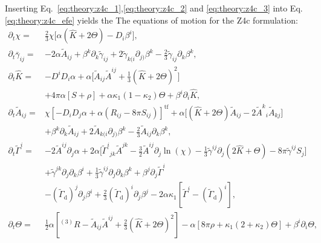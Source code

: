 Inserting Eq.~\eqref{eq:theory:z4c_1},\eqref{eq:theory:z4c_2} and \eqref{eq:theory:z4c_3} into
Eq.\eqref{eq:theory:z4c_efe} yields the 
The equations of motion for the Z4c formulation:
%
\begin{equation}
    \begin{aligned}
    \partial_t\chi =& \frac{2}{3}\chi \Big[ \alpha (\hat{K} + 2\Theta) - D_i\beta^i \Big], \\
    \partial_t\bar{\gamma}_{ij} =& -2\alpha\widetilde{A}_{ij} + \beta^k\partial_k\widetilde{\gamma}_{ij} + 
    2\widetilde{\gamma}_{k(i}\partial_{j)}\beta^k - \frac{2}{3}\widetilde{\gamma}_{ij}\partial_k\beta^k, \\
    \partial_t\hat{K} =& -D^{i}D_{i}\alpha + \alpha \Big[ \widetilde{A}_{ij}\widetilde{A}^{ij} + \frac{1}{3}(\hat{K} + 2\Theta)^2 \Big]  \\
    & + 4\pi \alpha [S + \rho] + \alpha \kappa_1 (1 - \kappa_2)\Theta + \beta^i\partial_i\hat{K},  \\
    \partial_t\widetilde{A}_{ij} =& \chi [ -D_i D_j \alpha + \alpha(R_{ij} - 8\pi S_{ij}) ]^{\text{tf}} + 
    \alpha \Big[ (\hat{K} + 2\Theta)\widetilde{A}_{ij} - 2 {\widetilde{A}^k}_i\widetilde{A}_{kj} \Big] \\
    & + \beta^k\partial_k\widetilde{A}_{ij} + 2\widetilde{A}_{k(i}\partial_{j)}\beta^k - \frac{2}{3}\widetilde{A}_{ij}\partial_{k}\beta^{k},  \\
    \partial_t\widetilde{\Gamma}^i =& -2\widetilde{A}^{ij}\partial_j\alpha + 2\alpha\Big[ {\widetilde{\Gamma}^i}_{jk}\widetilde{A}^{jk} - 
    \frac{3}{2}\widetilde{A}^{ij}\partial_j\ln(\chi) - \frac{1}{3}\widetilde{\gamma}^{ij}\partial_j(2\hat{K}+\Theta) - 8\pi\widetilde{\gamma}^{ij}S_j \Big] \\
    & + \widetilde{\gamma}^{jk}\partial_j\partial_k\beta^i + \frac{1}{3}\widetilde{\gamma}^{ij}\partial_j\partial_k\beta^k + \beta^j\partial_j\widetilde{\Gamma}^i \\
    & - (\widetilde{\Gamma}_{\text{d}})^j\partial_j\beta^i + \frac{2}{3}(\widetilde{\Gamma}_{\text{d}})^i\partial_j\beta^j - 
    2\alpha\kappa_1 [ \widetilde{\Gamma}^i - (\widetilde{\Gamma}_{\text{d}})^i ], \\
    \partial_t\Theta =& \frac{1}{2}\alpha [{^{(3)}R} - \widetilde{A}_{ij}\widetilde{A}^{ij} + \frac{2}{3}(\hat{K} + 2\Theta)^2] - 
    \alpha [ 8\pi\rho + \kappa_1(2+\kappa_2)\Theta ] + \beta^i\partial_i\Theta, 
    \end{aligned}
    \label{eq:theory:z4c_equations} %
\end{equation}
